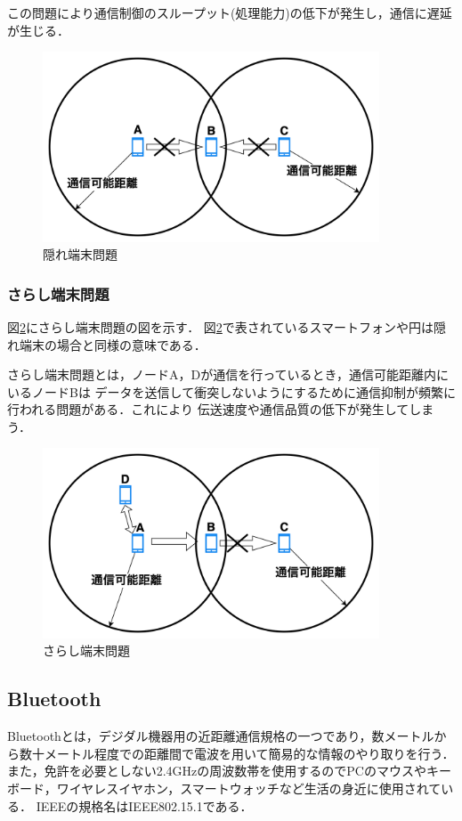 \documentclass[a4paper, 11pt]{ltjsarticle}
\begin{document}
この問題により通信制御のスループット(処理能力)の低下が発生し，通信に遅延が生じる．
\begin{figure}[H]
  \centering
  \includegraphics[width=100mm]{hidden_terminal_problem.png}
  \caption{隠れ端末問題}
  \label{hidden_problem}
\end{figure}

\subsubsection{さらし端末問題}
図\ref{exposed_problem}にさらし端末問題の図を示す．
図\ref{exposed_problem}で表されているスマートフォンや円は隠れ端末の場合と同様の意味である．

さらし端末問題とは，ノードA，Dが通信を行っているとき，通信可能距離内にいるノードBは
データを送信して衝突しないようにするために通信抑制が頻繁に行われる問題がある．これにより
伝送速度や通信品質の低下が発生してしまう．
\begin{figure}[H]
  \centering
  \includegraphics[width=100mm]{exposed_terminal_problem.png}
  \caption{さらし端末問題}
  \label{exposed_problem}
\end{figure}

\subsection{Bluetooth}
Bluetoothとは，デジダル機器用の近距離通信規格の一つであり，数メートルから数十メートル程度での距離間で電波を用いて簡易的な情報のやり取りを行う．
また，免許を必要としない2.4GHzの周波数帯を使用するのでPCのマウスやキーボード，ワイヤレスイヤホン，スマートウォッチなど生活の身近に使用されている．
IEEEの規格名はIEEE802.15.1である．
\end{document}
